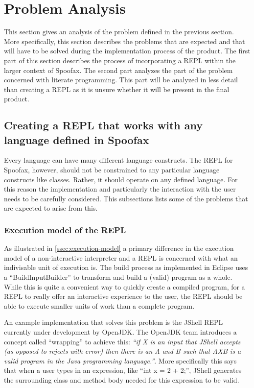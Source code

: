 \section{Problem Analysis}
\label{sec:problem-analysis}
This section gives an analysis of the problem defined in the previous
section. More specifically, this section describes the problems that
are expected and that will have to be solved during the implementation process
of the product. The first part of this section describes the process
of incorporating a REPL within the larger context of
Spoofax. The second part analyzes the part of the problem concerned
with literate programming. This part will be analyzed in less detail
than creating a REPL as it is unsure whether it will be present in
the final product.

\subsection{Creating a REPL that works with any language defined in Spoofax}
\label{ssec:incorp-repl-spoofax}

Every language can have many different language constructs. The REPL for
Spoofax, however, should not be constrained to any particular language
constructs like classes. Rather, it should operate on any defined language. For
this reason the implementation and particularly the interaction with the user
needs to be carefully considered. This subsections lists some of the problems
that are expected to arise from this.

\subsubsection{Execution model of the REPL}
\label{ssec:execution-model-repl}
As illustrated in \cref{ssec:execution-model} a primary difference in the
execution model of a non-interactive interpreter and a REPL is concerned with
what an indivisable unit of execution is. The build process as implemented in
Eclipse uses a ``BuildInputBuilder'' to transform and build a (valid) program
as a whole. While this is quite a convenient way to quickly create a compiled
program, for a REPL to really offer an interactive experience to the user, the
REPL should be able to execute smaller units of work than a complete program.

An example implementation that solves this problem is the JShell
REPL~\cite{jshell-repl} currently under development by OpenJDK.  The OpenJDK
team introduces a concept called ``wrapping'' to achieve this: \textit{``if X
is an input that JShell accepts (as opposed to rejects with error) then there
is an A and B such that AXB is a valid program in the Java programming
language.''}. More specifically this says that when a user types in an
expression, like ``int x = 2 + 2;'', JShell generates the surrounding class and
method body needed for this expression to be valid.

